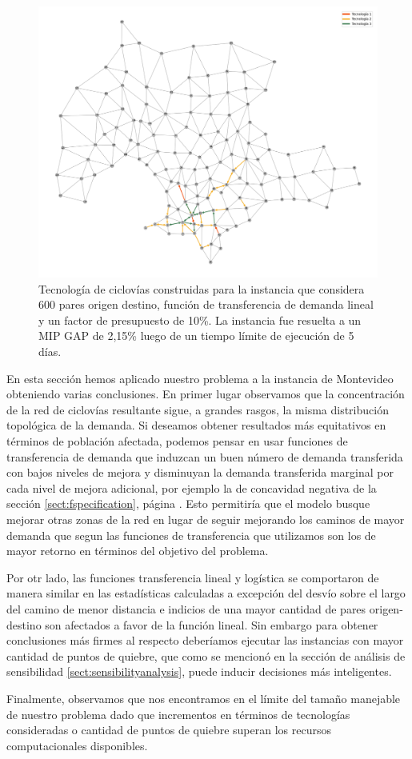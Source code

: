 \begin{figure}[h!]
  \centering
  \includegraphics[width=12cm]{../resources/montevideo_d3000.0_linear_0.1_budget_factor_infras.png}
    \caption{Tecnología de ciclovías construidas para la instancia que considera 600 pares origen destino, función de transferencia de demanda lineal y un factor de presupuesto de 10\%. La instancia fue resuelta a un MIP GAP de 2,15\% luego de un tiempo límite de ejecución de 5 días.}
  \label{fig:montevideolowbudgetinstance}
\end{figure}

\clearpage
En esta sección hemos aplicado nuestro problema a la instancia de Montevideo obteniendo varias conclusiones. En primer lugar observamos que la concentración de la red de ciclovías resultante sigue, a grandes rasgos, la misma distribución topológica de la demanda. Si deseamos obtener resultados más equitativos en términos de población afectada, podemos pensar en usar funciones de transferencia de demanda que induzcan un buen número de demanda transferida con bajos niveles de mejora y disminuyan la demanda transferida marginal por cada nivel de mejora adicional, por ejemplo la de concavidad negativa de la sección \ref{sect:fspecification}, página \pageref{sect:fspecification}. Esto permitiría que el modelo busque mejorar otras zonas de la red en lugar de seguir mejorando los caminos de mayor demanda que segun las funciones de transferencia que utilizamos son los de mayor retorno en términos del objetivo del problema.

Por otr lado, las funciones transferencia lineal y logística se comportaron de manera similar en las estadísticas calculadas a excepción del desvío sobre el largo del camino de menor distancia e indicios de una mayor cantidad de pares origen-destino son afectados a favor de la función lineal. Sin embargo para obtener conclusiones más firmes al respecto deberíamos ejecutar las instancias con mayor cantidad de puntos de quiebre, que como se mencionó en la sección de análisis de sensibilidad \ref{sect:sensibilityanalysis}, puede inducir decisiones más inteligentes.

Finalmente, observamos que nos encontramos en el límite del tamaño manejable de nuestro problema dado que incrementos en términos de tecnologías consideradas o cantidad de puntos de quiebre superan los recursos computacionales disponibles.
